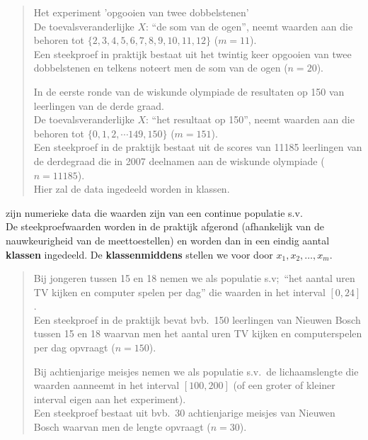\begin{small}
\begin{description}
\begin{quotation}
\item Het experiment 'opgooien van twee dobbelstenen' \\
De toevalsveranderlijke $X$: ``de som van de ogen'', neemt waarden aan die behoren tot $\{2,3,4,5,6,7,8,9,10,11,12\}$ ($m=11$). \\ 
 Een steekproef in praktijk bestaat uit het twintig keer opgooien van twee dobbelstenen en telkens noteert men de som van de ogen ($n=20$). 

\item In de eerste ronde van de wiskunde olympiade de resultaten op 150 van leerlingen van de derde graad.\\
De toevalsveranderlijke $X$: ``het resultaat op 150'', neemt waarden aan die behoren tot $\{0,1,2,\cdots 149,150\}$ ($m=151$).\\
Een steekproef in de praktijk bestaat uit de  scores van 11185 leerlingen van de derdegraad die in 2007 deelnamen aan de wiskunde olympiade ($n=11185$).\\
Hier zal de data ingedeeld worden in klassen.

\end{quotation}


\item[Continue kwantitatieve data] zijn numerieke data die waarden zijn van een  continue populatie s.v.\\
De  steekproefwaarden worden in de praktijk afgerond (afhankelijk van de nauwkeurigheid van de meettoestellen) en  worden dan in een eindig aantal {\bf klassen} ingedeeld. De {\bf klassenmiddens} stellen we voor door $x_1, x_2,\ldots,x_m$. 
 
\begin{quotation}
\item Bij jongeren tussen 15 en 18 nemen we als populatie s.v;\ ``het aantal uren TV kijken en computer spelen per dag'' die  waarden in het interval $[0,24]$.\\ Een steekproef in de praktijk bevat bvb.\ 150 leerlingen van Nieuwen Bosch tussen 15 en 18 waarvan men het aantal uren  TV kijken en computerspelen per dag opvraagt ($n= 150$).
\item Bij achtienjarige meisjes nemen we als populatie s.v.\  de lichaamslengte die waarden aanneemt in het interval  $[100,200]$ (of een groter of kleiner interval eigen aan het experiment).\\ Een steekproef bestaat uit bvb.\ 30 achtienjarige meisjes van Nieuwen Bosch waarvan men de lengte opvraagt ($n=30$). 
\end{quotation}



\end{description}
\end{small}
